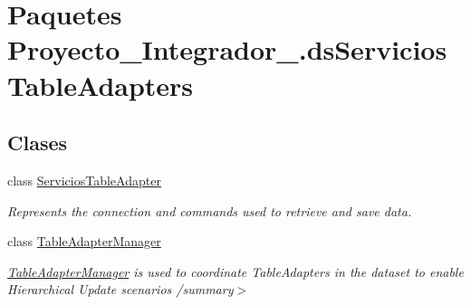 \hypertarget{namespace_proyecto___integrador__3_1_1ds_servicios_table_adapters}{\section{Paquetes Proyecto\-\_\-\-Integrador\-\_.\-ds\-Servicios\-Table\-Adapters}
\label{namespace_proyecto___integrador__3_1_1ds_servicios_table_adapters}
}
\subsection*{Clases}
\begin{DoxyCompactItemize}
\item 
class \hyperlink{class_proyecto___integrador__3_1_1ds_servicios_table_adapters_1_1_servicios_table_adapter}{Servicios\-Table\-Adapter}
\begin{DoxyCompactList}\small\item\em Represents the connection and commands used to retrieve and save data. \end{DoxyCompactList}\item 
class \hyperlink{class_proyecto___integrador__3_1_1ds_servicios_table_adapters_1_1_table_adapter_manager}{Table\-Adapter\-Manager}
\begin{DoxyCompactList}\small\item\em \hyperlink{class_proyecto___integrador__3_1_1ds_servicios_table_adapters_1_1_table_adapter_manager}{Table\-Adapter\-Manager} is used to coordinate Table\-Adapters in the dataset to enable Hierarchical Update scenarios /summary$>$ \end{DoxyCompactList}\end{DoxyCompactItemize}
